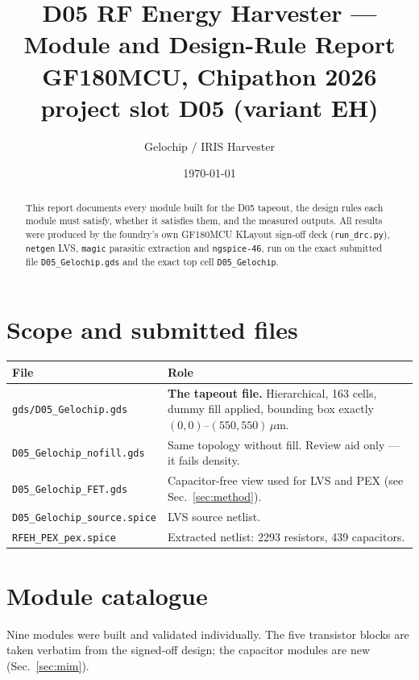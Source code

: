 \documentclass[11pt,a4paper]{article}
\title{\textbf{D05 RF Energy Harvester --- Module and Design-Rule Report}\\[4pt]
\large GF180MCU, Chipathon 2026 project slot D05 (variant EH)}
\author{Gelochip / IRIS Harvester}
\date{\today}
\newcommand{\um}{\,$\mu$m}
\begin{document}
\maketitle

\begin{abstract}
\noindent
This report documents every module built for the D05 tapeout, the design rules each module
must satisfy, whether it satisfies them, and the measured outputs. All results were produced
by the foundry's own GF180MCU KLayout sign-off deck (\texttt{run\_drc.py}), \texttt{netgen}
LVS, \texttt{magic} parasitic extraction and \texttt{ngspice-46}, run on the exact submitted
file \texttt{D05\_Gelochip.gds} and the exact top cell \texttt{D05\_Gelochip}.
\end{abstract}

\section{Scope and submitted files}

\begin{tabularx}{\textwidth}{@{}lX@{}}
\toprule
\textbf{File} & \textbf{Role} \\
\midrule
\texttt{gds/D05\_Gelochip.gds} & \textbf{The tapeout file.} Hierarchical, 163 cells, dummy fill applied, bounding box exactly $(0,0)$--$(550,550)$\um. \\
\texttt{D05\_Gelochip\_nofill.gds} & Same topology without fill. Review aid only --- it fails density. \\
\texttt{D05\_Gelochip\_FET.gds} & Capacitor-free view used for LVS and PEX (see Sec.~\ref{sec:method}). \\
\texttt{D05\_Gelochip\_source.spice} & LVS source netlist. \\
\texttt{RFEH\_PEX\_pex.spice} & Extracted netlist: 2293 resistors, 439 capacitors. \\
\bottomrule
\end{tabularx}

\section{Module catalogue}

Nine modules were built and validated individually. The five transistor blocks are taken
verbatim from the signed-off design; the capacitor modules are new (Sec.~\ref{sec:mim}).
\end{document}
